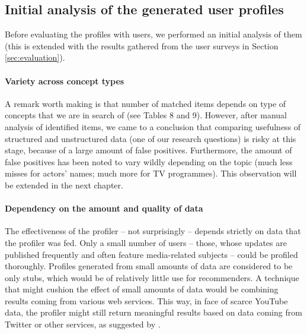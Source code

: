 \subsection{Initial analysis of the generated user profiles}

Before evaluating the profiles with users, we performed an initial analysis of
them (this is extended with the results gathered from the user surveys in
Section \ref{sec:evaluation}).

\paragraph{Variety across concept types}

A remark worth making is that number of matched items depends on type of
concepts that we are in search of (see Tables 8 and 9). However, after manual
analysis of identified items, we came to a conclusion that comparing usefulness
of structured and unstructured data (one of our research questions) is risky at
this stage, because of a large amount of false positives. Furthermore, the
amount of false positives has been noted to vary wildly depending on the topic
(much less misses for actors' names; much more for TV programmes). This
observation will be extended in the next chapter.

\paragraph{Dependency on the amount and quality of data}

The effectiveness of the profiler -- not surprisingly -- depends strictly on data
that the profiler was fed. Only a small number of users -- those, whose updates
are published frequently and often feature media-related subjects -- could be
profiled thoroughly. Profiles generated from small amounts of data are considered
to be only stubs, which would be of relatively little use for recommenders. A technique that
might cushion the effect of small amounts of data would be combining results
coming from various web services. This way, in face of scarce YouTube data, the
profiler might still return meaningful results based on data coming from
Twitter or other services, as suggested by \cite{public-profiles}.
